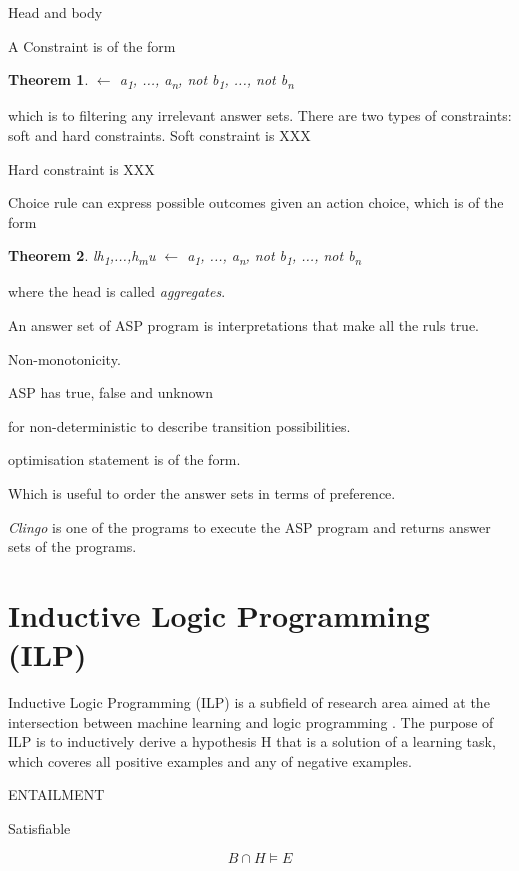 \documentclass[12pt,twoside]{report}
\newtheorem{theorem}{Theorem}
\begin{document}
Head and body

A Constraint is of the form

\begin{theorem}
$\leftarrow$ a\textsubscript{1}, ..., a\textsubscript{n}, not b\textsubscript{1}, ..., not b\textsubscript{n}
\end{theorem}

which is to filtering any irrelevant answer sets.
There are two types of constraints: soft and hard constraints. Soft constraint is XXX

Hard constraint is XXX

Choice rule can express possible outcomes given an action choice, which is of the form

\begin{theorem}
l{h\textsubscript{1},...,h\textsubscript{m}}u $\leftarrow$ a\textsubscript{1}, ..., a\textsubscript{n}, not b\textsubscript{1}, ..., not b\textsubscript{n}
\end{theorem}

where the head is called \textit{aggregates}.

An answer set of ASP program is interpretations that make all the ruls true.

Non-monotonicity.

ASP has true, false and unknown

for non-deterministic to describe transition possibilities.

optimisation statement is of the form.

Which is useful to order the answer sets in terms of preference.

\textit{Clingo} is one of the programs to execute the ASP program and returns answer sets of the programs.

\section{Inductive Logic Programming (ILP)}

\label{ilp}
Inductive Logic Programming (ILP) is a subfield of research area aimed at the intersection between machine learning and logic programming \cite{Muggleton1991}. The purpose of ILP is to inductively derive a hypothesis H that is a solution of a learning task, which coveres all positive examples and any of negative examples.

ENTAILMENT

Satisfiable

\begin{equation}
B \cap H \models E
\end{equation}
\end{document}

